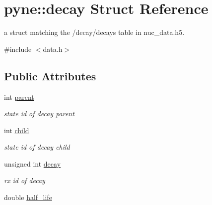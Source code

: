 \hypertarget{structpyne_1_1decay}{}\section{pyne\+:\+:decay Struct Reference}
\label{structpyne_1_1decay}


a struct matching the \textquotesingle{}/decay/decays\textquotesingle{} table in nuc\+\_\+data.\+h5.  




{\ttfamily \#include $<$data.\+h$>$}

\subsection*{Public Attributes}
\begin{DoxyCompactItemize}
\item 
int \hyperlink{structpyne_1_1decay_a49696dc372feeb09800f96d6733367f2}{parent}\hypertarget{structpyne_1_1decay_a49696dc372feeb09800f96d6733367f2}{}\label{structpyne_1_1decay_a49696dc372feeb09800f96d6733367f2}

\begin{DoxyCompactList}\small\item\em state id of decay parent \end{DoxyCompactList}\item 
int \hyperlink{structpyne_1_1decay_a945a2d85e13b6457072dcbc3f53b1d68}{child}\hypertarget{structpyne_1_1decay_a945a2d85e13b6457072dcbc3f53b1d68}{}\label{structpyne_1_1decay_a945a2d85e13b6457072dcbc3f53b1d68}

\begin{DoxyCompactList}\small\item\em state id of decay child \end{DoxyCompactList}\item 
unsigned int \hyperlink{structpyne_1_1decay_acd08ac0848d8491d1320fe538f0ed35e}{decay}\hypertarget{structpyne_1_1decay_acd08ac0848d8491d1320fe538f0ed35e}{}\label{structpyne_1_1decay_acd08ac0848d8491d1320fe538f0ed35e}

\begin{DoxyCompactList}\small\item\em rx id of decay \end{DoxyCompactList}\item 
double \hyperlink{structpyne_1_1decay_aff2afc2b50e4e53eb60a67d2448cb889}{half\+\_\+life}\hypertarget{structpyne_1_1decay_aff2afc2b50e4e53eb60a67d2448cb889}{}\label{structpyne_1_1decay_aff2afc2b50e4e53eb60a67d2448cb889}


\end{DoxyCompactItemize}
